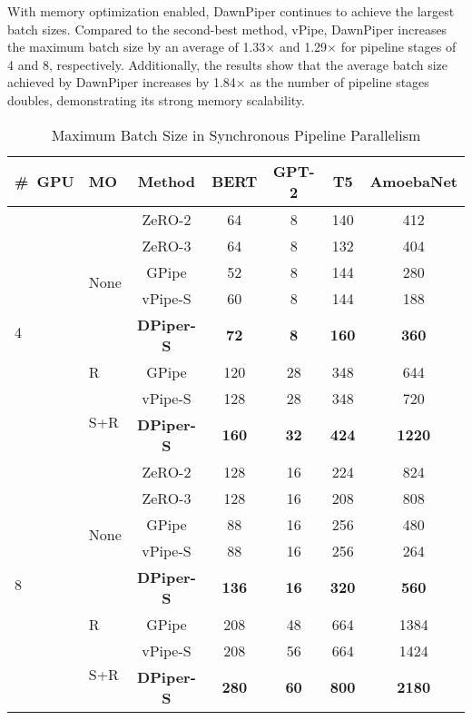 With memory optimization enabled, DawnPiper continues to achieve the largest batch sizes.
Compared to the second-best method, vPipe, DawnPiper increases the maximum batch size by
an average of 1.33$\times$ and 1.29$\times$ for pipeline stages of 4 and 8, respectively.
Additionally, the results show that the average batch size achieved by DawnPiper
increases by 1.84$\times$ as the number of pipeline stages doubles, demonstrating its strong memory scalability.
\begin{table}[htbp]
  \centering
  \caption{Maximum Batch Size in Synchronous Pipeline Parallelism}
    \begin{tabular}{m{2em}|m{2em}|ccccc}
    \toprule
    \#\ GPU & MO & Method & BERT & GPT-2 & T5 & AmoebaNet \\
    \midrule
    \multirow{8}{*}{4} & \multirow{5}{*}{None} & ZeRO-2 & 64    & 8     & 140   & 412 \\
          &       & ZeRO-3 & 64    & 8     & 132   & 404 \\
          &       & GPipe & 52    & 8     & 144   & 280 \\
          &       & vPipe-S & 60    & 8     & 144   & 188 \\
          &       & \textbf{DPiper-S} & \textbf{72} & \textbf{8} & \textbf{160} & \textbf{360} \\
\cmidrule{2-7}          & R & GPipe & 120   & 28    & 348   & 644 \\
\cmidrule{2-2}          & \multirow{2}{*}{S+R} & vPipe-S & 128   & 28    & 348   & 720 \\
          &       & \textbf{DPiper-S} & \textbf{160} & \textbf{32} & \textbf{424} & \textbf{1220} \\
    \midrule
    \multirow{8}{*}{8} & \multirow{5}{*}{None} & ZeRO-2 & 128   & 16    & 224   & 824 \\
          &       & ZeRO-3 & 128   & 16    & 208   & 808 \\
          &       & GPipe & 88    & 16    & 256   & 480 \\
          &       & vPipe-S & 88    & 16    & 256   & 264 \\
          &       & \textbf{DPiper-S} & \textbf{136} & \textbf{16} & \textbf{320} & \textbf{560} \\
\cmidrule{2-7}          & R & GPipe & 208   & 48    & 664   & 1384 \\
\cmidrule{2-2}          & \multirow{2}{*}{S+R} & vPipe-S & 208   & 56    & 664   & 1424 \\
          &       & \textbf{DPiper-S} & \textbf{280} & \textbf{60} & \textbf{800} & \textbf{2180} \\
    \bottomrule
    \end{tabular}%
  \label{table:maxbs-sync}%
\end{table}

